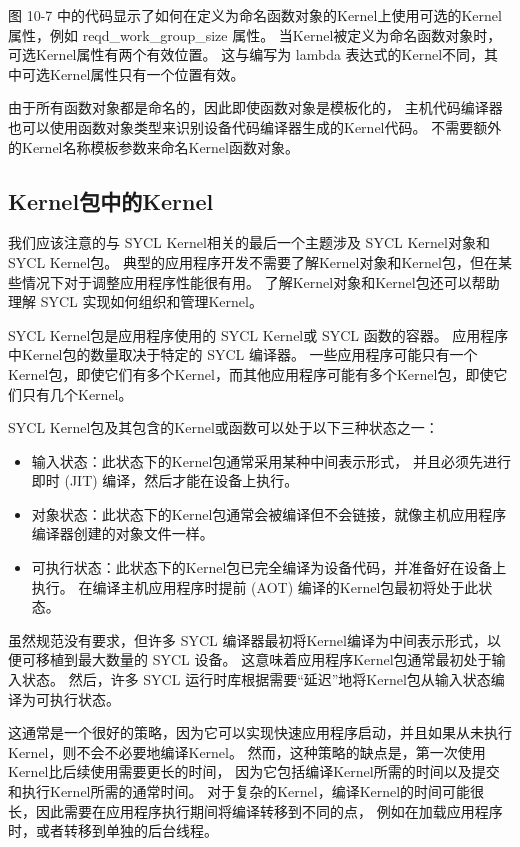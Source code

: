 图 10-7 中的代码显示了如何在定义为命名函数对象的Kernel上使用可选的Kernel属性，例如 reqd\_work\_group\_size 属性。 
当Kernel被定义为命名函数对象时，可选Kernel属性有两个有效位置。 
这与编写为 lambda 表达式的Kernel不同，其中可选Kernel属性只有一个位置有效。

由于所有函数对象都是命名的，因此即使函数对象是模板化的，
主机代码编译器也可以使用函数对象类型来识别设备代码编译器生成的Kernel代码。 
不需要额外的Kernel名称模板参数来命名Kernel函数对象。

\subsection{Kernel包中的Kernel}
我们应该注意的与 SYCL Kernel相关的最后一个主题涉及 SYCL Kernel对象和 SYCL Kernel包。 
典型的应用程序开发不需要了解Kernel对象和Kernel包，但在某些情况下对于调整应用程序性能很有用。 
了解Kernel对象和Kernel包还可以帮助理解 SYCL 实现如何组织和管理Kernel。

SYCL Kernel包是应用程序使用的 SYCL Kernel或 SYCL 函数的容器。 
应用程序中Kernel包的数量取决于特定的 SYCL 编译器。 
一些应用程序可能只有一个Kernel包，即使它们有多个Kernel，而其他应用程序可能有多个Kernel包，即使它们只有几个Kernel。

SYCL Kernel包及其包含的Kernel或函数可以处于以下三种状态之一：

\begin{itemize}
	\item 输入状态：此状态下的Kernel包通常采用某种中间表示形式，
	并且必须先进行即时 (JIT) 编译，然后才能在设备上执行。

	\item 对象状态：此状态下的Kernel包通常会被编译但不会链接，就像主机应用程序编译器创建的对象文件一样。

	\item 可执行状态：此状态下的Kernel包已完全编译为设备代码，并准备好在设备上执行。 
	在编译主机应用程序时提前 (AOT) 编译的Kernel包最初将处于此状态。
\end{itemize}

虽然规范没有要求，但许多 SYCL 编译器最初将Kernel编译为中间表示形式，以便可移植到最大数量的 SYCL 设备。 
这意味着应用程序Kernel包通常最初处于输入状态。 
然后，许多 SYCL 运行时库根据需要“延迟”地将Kernel包从输入状态编译为可执行状态。

这通常是一个很好的策略，因为它可以实现快速应用程序启动，并且如果从未执行Kernel，则不会不必要地编译Kernel。 
然而，这种策略的缺点是，第一次使用Kernel比后续使用需要更长的时间，
因为它包括编译Kernel所需的时间以及提交和执行Kernel所需的通常时间。 
对于复杂的Kernel，编译Kernel的时间可能很长，因此需要在应用程序执行期间将编译转移到不同的点，
例如在加载应用程序时，或者转移到单独的后台线程。

